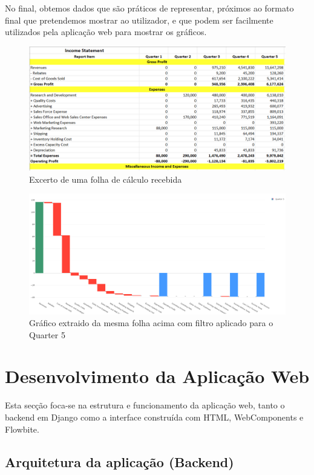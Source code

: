 No final, obtemos dados que são práticos de representar, próximos ao formato final que pretendemos mostrar ao utilizador, e que podem ser facilmente utilizados pela aplicação web para mostrar os gráficos.

\begin{figure}[H]
\centering
\includegraphics[width=\textwidth]{./img/before}
\caption{Excerto de uma folha de cálculo recebida}
\end{figure}

\begin{figure}[H]
\centering
\includegraphics[width=\textwidth]{./img/after}
\caption{Gráfico extraido da mesma folha acima com filtro aplicado para o Quarter 5}
\end{figure}

\section{Desenvolvimento da Aplicação Web}

Esta secção foca-se na estrutura e funcionamento da aplicação web, tanto o backend em Django como a interface construída com HTML, WebComponents e Flowbite.

\subsection{Arquitetura da aplicação (Backend)}

